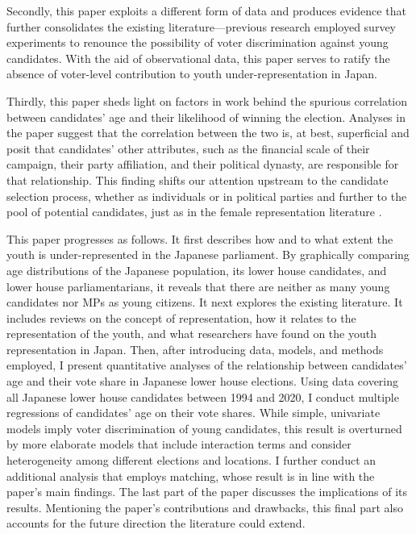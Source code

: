 \documentclass[a4paper, 12pt]{article}\usepackage[dvipdfmx]{graphicx}\usepackage[]{xcolor}
\begin{document}
Secondly, this paper exploits a different form of data and produces evidence that further consolidates the existing literature—previous research employed survey experiments to renounce the possibility of voter discrimination against young candidates. With the aid of observational data, this paper serves to ratify the absence of voter-level contribution to youth under-representation in Japan. 

Thirdly, this paper sheds light on factors in work behind the spurious correlation between candidates' age and their likelihood of winning the election. Analyses in the paper suggest that the correlation between the two is, at best, superficial and posit that candidates' other attributes, such as the financial scale of their campaign, their party affiliation, and their political dynasty, are responsible for that relationship. This finding shifts our attention upstream to the candidate selection process, whether as individuals or in political parties and further to the pool of potential candidates, just as in the female representation literature \citep{lawless2010still}. 

This paper progresses as follows. It first describes how and to what extent the youth is under-represented in the Japanese parliament. By graphically comparing age distributions of the Japanese population, its lower house candidates, and lower house parliamentarians, it reveals that there are neither as many young candidates nor MPs as young citizens. It next explores the existing literature. It includes reviews on the concept of representation, how it relates to the representation of the youth, and what researchers have found on the youth representation in Japan. Then, after introducing data, models, and methods employed, I present quantitative analyses of the relationship between candidates' age and their vote share in Japanese lower house elections. Using data covering all Japanese lower house candidates between 1994 and 2020, I conduct multiple regressions of candidates' age on their vote shares. While simple, univariate models imply voter discrimination of young candidates, this result is overturned by more elaborate models that include interaction terms and consider heterogeneity among different elections and locations. I further conduct an additional analysis that employs matching, whose result is in line with the paper's main findings. The last part of the paper discusses the implications of its results. Mentioning the paper's contributions and drawbacks, this final part also accounts for the future direction the literature could extend. 
\end{document}

